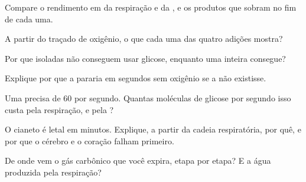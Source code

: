 \begin{exercise}[$\star$]\label{exo:g12:respiration-fermentation:5}
Compare o rendimento em  da respiração e da , e os
produtos que sobram no fim de cada uma.
\end{exercise}

\begin{exercise}[$\star\star$]\label{exo:g12:respiration-fermentation:6}
A partir do traçado de oxigênio, o que cada uma das quatro adições mostra?
\end{exercise}

\begin{exercise}[$\star\star$]\label{exo:g12:respiration-fermentation:7}
Por que  isoladas não conseguem usar glicose, enquanto uma  inteira consegue?
\end{exercise}

\begin{exercise}[$\star\star$]\label{exo:g12:respiration-fermentation:8}
Explique por que a  pararia em segundos sem oxigênio se a
 não existisse.
\end{exercise}

\begin{exercise}[$\star\star$]\label{exo:g12:respiration-fermentation:9}
Uma  precisa de 60  por segundo. Quantas moléculas de glicose
por segundo isso custa pela respiração, e pela ?
\end{exercise}

\begin{exercise}[$\star\star$]\label{exo:g12:respiration-fermentation:10}
O cianeto é letal em minutos. Explique, a partir da cadeia
respiratória, por quê, e por que o cérebro e o coração falham primeiro.
\end{exercise}

\begin{exercise}[$\star\star$]\label{exo:g12:respiration-fermentation:11}
De onde vem o gás carbônico que você expira, etapa por etapa? E a água
produzida pela respiração?
\end{exercise}

